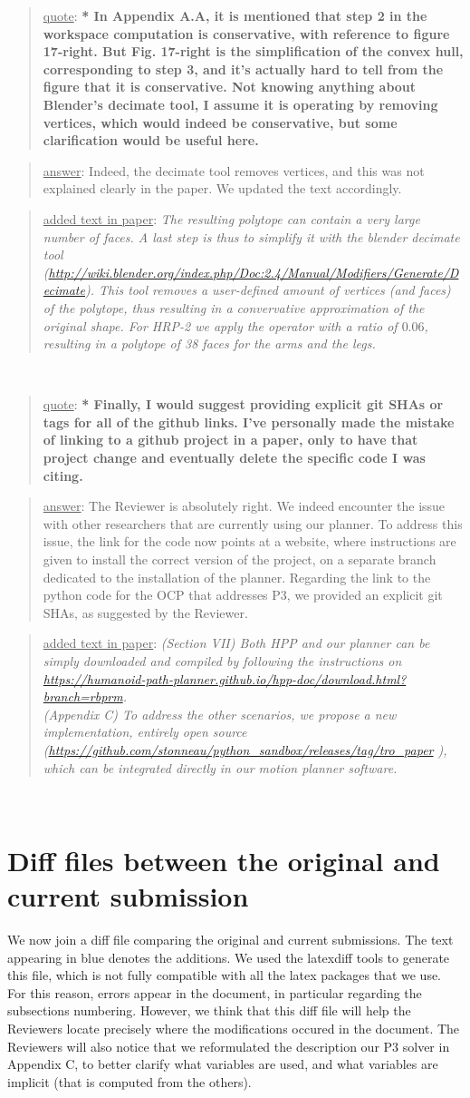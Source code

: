 \documentclass[a4paper]{article}
\newcommand{\done}[0]{}
\newcommand\quot[1]{\begin{quote} \underline{quote}: \textbf{#1}\end{quote}}
\newcommand\as[1]{\begin{quote} \underline{answer}: {#1}\end{quote} }
\newcommand\qt[1]{\begin{quote} \underline{added text in paper}: \textit{#1}\end{quote} \leavevmode \\ }
\begin{document}
\quot{* In Appendix A.A, it is mentioned that step 2 in the workspace
computation is conservative, with reference to figure 17-right. But
Fig. 17-right is the simplification of the convex hull, corresponding
to step 3, and it's actually hard to tell from the figure that it is
conservative. Not knowing anything about Blender's decimate tool, I
assume it is operating by removing vertices, which would indeed be
conservative, but some clarification would be useful here.}
\as{Indeed, the decimate tool removes vertices, and this was not explained clearly in the paper. We updated the text accordingly.}
\qt{The resulting polytope can contain a very large number of faces. A last step is thus to simplify it with the blender decimate tool (\url{http://wiki.blender.org/index.php/Doc:2.4/Manual/Modifiers/Generate/Decimate}). This tool removes a user-defined amount of vertices (and faces) of the polytope, thus resulting
in a convervative approximation of the original shape. For HRP-2 we apply the operator with a ratio of $0.06$, resulting in a polytope of 38 faces for the arms and the legs.}\done

\quot{* Finally, I would suggest providing explicit git SHAs or tags for all
of the github links. I've personally made the mistake of linking to a
github project in a paper, only to have that project change and
eventually delete the specific code I was citing. }
\as{The Reviewer is absolutely right. We indeed encounter the issue with other researchers that are currently using our planner. 
To address this issue, the link for the code now points at a website, where instructions are given to install the correct version of the project, on a separate branch
dedicated to the installation of the planner.
Regarding the link to the python code for the OCP that addresses P3, we provided an explicit git SHAs, as suggested by the Reviewer.}
\qt{(Section VII) Both HPP and our planner can be simply downloaded and compiled by following the instructions on
\url{https://humanoid-path-planner.github.io/hpp-doc/download.html?branch=rbprm}. \\
(Appendix C) To address the other scenarios, we propose a new implementation, entirely open source (\url{https://github.com/stonneau/python_sandbox/releases/tag/tro_paper} ), which can be integrated directly in our motion planner software. }
\done

\section{Diff files between the original and current submission}
We now join a diff file comparing the original and current submissions.
The text appearing in blue denotes the additions. We used the latexdiff tools to generate this file, which is not fully compatible with all the latex packages that we use.
For this reason, errors appear in the document, in particular regarding the subsections numbering. However, we think that this diff file will help the Reviewers locate precisely
where the modifications occured in the document. The Reviewers will also notice that we reformulated the description our P3 solver in Appendix C, to better clarify what variables
are used, and what variables are implicit (that is computed from the others).


\end{document}
